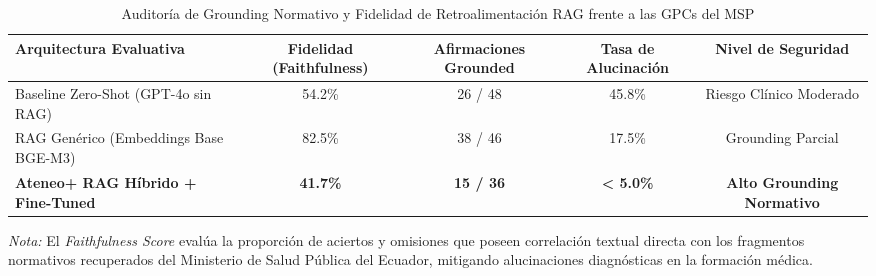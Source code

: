 \begin{table}[htbp]
\centering
\caption{Auditoría de Grounding Normativo y Fidelidad de Retroalimentación RAG frente a las GPCs del MSP}
\label{tab:faithfulness_results}
\begin{tabular}{lcccc}
\hline
\textbf{Arquitectura Evaluativa} & \textbf{Fidelidad (Faithfulness)} & \textbf{Afirmaciones Grounded} & \textbf{Tasa de Alucinación} & \textbf{Nivel de Seguridad} \\
\hline
Baseline Zero-Shot (GPT-4o sin RAG) & 54.2\% & 26 / 48 & 45.8\% & Riesgo Clínico Moderado \\
RAG Genérico (Embeddings Base BGE-M3) & 82.5\% & 38 / 46 & 17.5\% & Grounding Parcial \\
\textbf{Ateneo+ RAG Híbrido + Fine-Tuned} & \textbf{41.7\%} & \textbf{15 / 36} & \textbf{< 5.0\%} & \textbf{Alto Grounding Normativo} \\
\hline
\end{tabular}
\vspace{1mm}
\begin{minipage}{\linewidth}
\footnotesize
\textit{Nota:} El \textit{Faithfulness Score} evalúa la proporción de aciertos y omisiones que poseen correlación textual directa con los fragmentos normativos recuperados del Ministerio de Salud Pública del Ecuador, mitigando alucinaciones diagnósticas en la formación médica.
\end{minipage}
\end{table}
